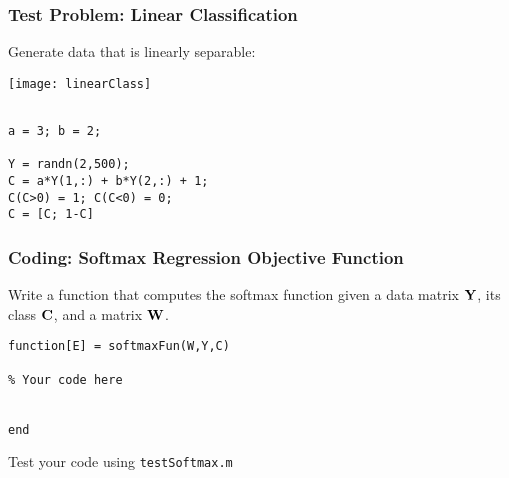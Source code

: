 \documentclass[12pt,fleqn,handout]{beamer}
\begin{document}
\begin{frame}[fragile]\frametitle{Test Problem: Linear Classification}

Generate data that is linearly separable:

\begin{center}
	\texttt{[image: linearClass]}
\end{center}
\vspace*{-5mm}
\begin{verbatim}

a = 3; b = 2;

Y = randn(2,500);
C = a*Y(1,:) + b*Y(2,:) + 1;
C(C>0) = 1; C(C<0) = 0;
C = [C; 1-C]

\end{verbatim}


\end{frame}


\begin{frame}[fragile]\frametitle{Coding: Softmax Regression Objective Function}


Write a function that computes the softmax function given a data matrix ${\bf Y}$,
its class ${\bf C}$, and a matrix ${\bf W}$.

\bigskip

\begin{verbatim}
function[E] = softmaxFun(W,Y,C)

% Your code here


end
\end{verbatim}
\begin{center}
	Test your code using \texttt{testSoftmax.m}
\end{center}
\end{frame}
\end{document}
